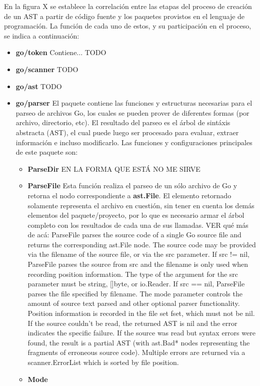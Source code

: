 En la figura X se establece la correlación entre las etapas del proceso de creación de un AST a partir de código fuente y los paquetes provistos en el lenguaje de programación.
La función de cada uno de estos, y su participación en el proceso, se indica a continuación:
\begin{itemize}
  \item \textbf{go/token} Contiene... TODO
  
  \item \textbf{go/scanner} TODO
  
  \item \textbf{go/ast} TODO
  
  \item \textbf{go/parser} El paquete contiene las funciones y estructuras necesarias para el parseo de archivos Go, los cuales se pueden prover de diferentes formas (por archivo, directorio, etc).
  El resultado del parseo es el árbol de sintáxis abstracta (AST), el cual puede luego ser procesado para evaluar, extraer información e incluso modificarlo.
  Las funciones y configuraciones principales de este paquete son:
  \begin{itemize}[noitemsep]
    \item \textbf{ParseDir} EN LA FORMA QUE ESTÁ NO ME SIRVE
    
    \item \textbf{ParseFile} Esta función realiza el parseo de un sólo archivo de Go y retorna el nodo correspondiente a \textbf{ast.File}.
    El elemento retornado solamente representa el archivo en cuestión, sin tener en cuenta los demás elementos del paquete/proyecto, por lo que es necesario armar el árbol completo con los resultados de cada una de sus llamadas.
    VER qué más de acá:
    ParseFile parses the source code of a single Go source file and returns the corresponding ast.File node. The source code may be provided via the filename of the source file, or via the src parameter.
    If src != nil, ParseFile parses the source from src and the filename is only used when recording position information. The type of the argument for the src parameter must be string, []byte, or io.Reader. If src == nil, ParseFile parses the file specified by filename.
    The mode parameter controls the amount of source text parsed and other optional parser functionality. Position information is recorded in the file set fset, which must not be nil.
    If the source couldn't be read, the returned AST is nil and the error indicates the specific failure. If the source was read but syntax errors were found, the result is a partial AST (with ast.Bad* nodes representing the fragments of erroneous source code). Multiple errors are returned via a scanner.ErrorList which is sorted by file position.

    \item \textbf{Mode}
  \end{itemize}
\end{itemize}

